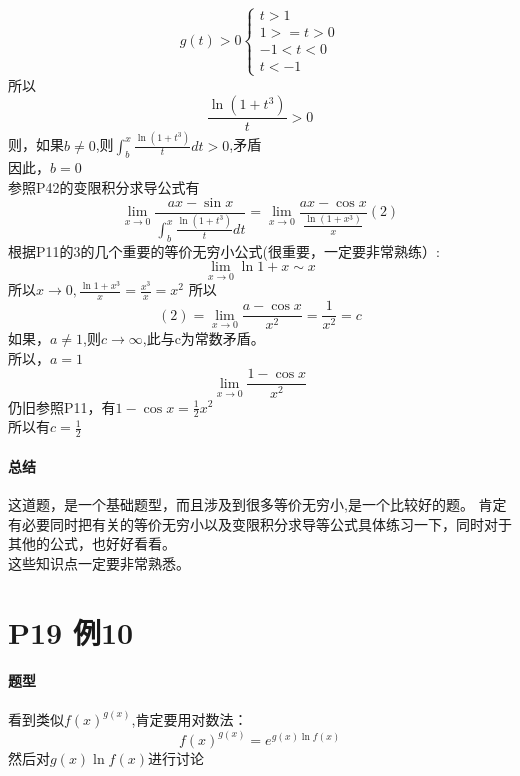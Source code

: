 \documentclass[a4paper]{ctexart}
\begin{document}
\begin{multicols}{2}
$$
g(t) > 0
\begin{cases}
    t>1\\
    1>=t>0\\
    -1<t<0\\
    t<-1
\end{cases}
$$
所以
$$
\frac{
    \ln{(1+t^3)} }
    {t} > 0
$$
则，如果$b\neq 0$,则$
    \int_{b}^{x}{
            \frac{
                \ln{(1+t^3)} }
                {t}
        dt} > 0$,矛盾\\
因此，$b=0$\\
参照P42的变限积分求导公式有\\
$$
\lim_{x\rightarrow 0}{
        \frac{ax-\sin{x}}
            {
                \int_{b}^{x}{
                        \frac{
                            \ln{(1+t^3)} }
                            {t}
                    dt}
            }
    }
    =
\lim_{x\rightarrow 0}{
        \frac{ax-\cos{x}}
            {
                \frac{
                    \ln{(1+x^3)} }
                    {x}
            }
    }
    (2)
$$
根据P11的3的几个重要的等价无穷小公式(很重要，一定要非常熟练）:
$$
\lim_{x \rightarrow 0}{\ln{1+x} \sim x}
$$
所以$
x \rightarrow 0,
\frac{\ln{1+x^3}}{x}=
\frac{x^3}{x}=
x^2
$
所以
$$
(2)=
\lim_{x \rightarrow 0}{
    \frac{a-\cos{x}}
        {x^2}
}=\frac{1}{x^2} = c
$$
如果，$a\neq 1$,则$c\rightarrow \infty$,此与c为常数矛盾。\\
所以，$a=1$\\
$$
\lim_{x \rightarrow 0}{
    \frac{
        1-\cos{x}
    }{x^2}
}
$$
仍旧参照P11，有$1-\cos{x}=\frac{1}{2}x^2$\\
所以有$c=\frac{1}{2}$\\
\paragraph{总结}
这道题，是一个基础题型，而且涉及到很多等价无穷小,是一个比较好的题。 肯定有必要同时把有关的等价无穷小以及变限积分求导等公式具体练习一下，同时对于其他的公式，也好好看看。\\
这些知识点一定要非常熟悉。\\


\section{P19 例10}
\paragraph{题型}
看到类似$f(x)^{g(x)}$,肯定要用对数法：\\
$$
f(x)^{g(x)}
=
e^{
    g(x)\ln{f(x)}
    }
$$
然后对$g(x)\ln{f(x)}$进行讨论\\


\end{multicols}
\end{document}
